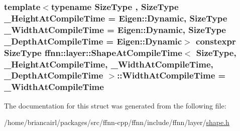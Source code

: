 \hypertarget{structffnn_1_1layer_1_1_shape_at_compile_time_a2a4feac621922000b64a6143a7ba4bc9}{
\subsubsection[{Width\-At\-Compile\-Time}]{\setlength{\rightskip}{0pt plus 5cm}template$<$typename Size\-Type , Size\-Type \-\_\-\-Height\-At\-Compile\-Time = Eigen\-::\-Dynamic, Size\-Type \-\_\-\-Width\-At\-Compile\-Time = Eigen\-::\-Dynamic, Size\-Type \-\_\-\-Depth\-At\-Compile\-Time = Eigen\-::\-Dynamic$>$ constexpr Size\-Type {\bf ffnn\-::layer\-::\-Shape\-At\-Compile\-Time}$<$ Size\-Type, \-\_\-\-Height\-At\-Compile\-Time, \-\_\-\-Width\-At\-Compile\-Time, \-\_\-\-Depth\-At\-Compile\-Time $>$\-::Width\-At\-Compile\-Time = \-\_\-\-Width\-At\-Compile\-Time\hspace{0.3cm}{\ttfamily [static]}}}\label{structffnn_1_1layer_1_1_shape_at_compile_time_a2a4feac621922000b64a6143a7ba4bc9}


The documentation for this struct was generated from the following file\-:\begin{DoxyCompactItemize}
\item 
/home/briancairl/packages/src/ffnn-\/cpp/ffnn/include/ffnn/layer/\hyperlink{shape_8h}{shape.\-h}\end{DoxyCompactItemize}
